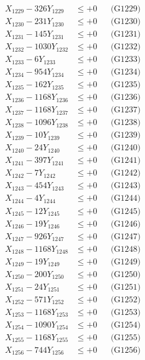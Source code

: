 \documentclass[a4paper,10pt]{article}
\begin{document}
{\begin{align}
X_{1229} - 326Y_{1229} &\leq +0 && \text{(G1229)} \\
X_{1230} - 231Y_{1230} &\leq +0 && \text{(G1230)} \\
\allowbreak
X_{1231} - 145Y_{1231} &\leq +0 && \text{(G1231)} \\
X_{1232} - 1030Y_{1232} &\leq +0 && \text{(G1232)} \\
X_{1233} - 6Y_{1233} &\leq +0 && \text{(G1233)} \\
X_{1234} - 954Y_{1234} &\leq +0 && \text{(G1234)} \\
X_{1235} - 162Y_{1235} &\leq +0 && \text{(G1235)} \\
X_{1236} - 1168Y_{1236} &\leq +0 && \text{(G1236)} \\
X_{1237} - 1168Y_{1237} &\leq +0 && \text{(G1237)} \\
X_{1238} - 1096Y_{1238} &\leq +0 && \text{(G1238)} \\
X_{1239} - 10Y_{1239} &\leq +0 && \text{(G1239)} \\
X_{1240} - 24Y_{1240} &\leq +0 && \text{(G1240)} \\
\allowbreak
X_{1241} - 397Y_{1241} &\leq +0 && \text{(G1241)} \\
X_{1242} - 7Y_{1242} &\leq +0 && \text{(G1242)} \\
X_{1243} - 454Y_{1243} &\leq +0 && \text{(G1243)} \\
X_{1244} - 4Y_{1244} &\leq +0 && \text{(G1244)} \\
X_{1245} - 12Y_{1245} &\leq +0 && \text{(G1245)} \\
X_{1246} - 19Y_{1246} &\leq +0 && \text{(G1246)} \\
X_{1247} - 926Y_{1247} &\leq +0 && \text{(G1247)} \\
X_{1248} - 1168Y_{1248} &\leq +0 && \text{(G1248)} \\
X_{1249} - 19Y_{1249} &\leq +0 && \text{(G1249)} \\
X_{1250} - 200Y_{1250} &\leq +0 && \text{(G1250)} \\
\allowbreak
X_{1251} - 24Y_{1251} &\leq +0 && \text{(G1251)} \\
X_{1252} - 571Y_{1252} &\leq +0 && \text{(G1252)} \\
X_{1253} - 1168Y_{1253} &\leq +0 && \text{(G1253)} \\
X_{1254} - 1090Y_{1254} &\leq +0 && \text{(G1254)} \\
X_{1255} - 1168Y_{1255} &\leq +0 && \text{(G1255)} \\
X_{1256} - 744Y_{1256} &\leq +0 && \text{(G1256)} \\

\end{align}}
\end{document}
